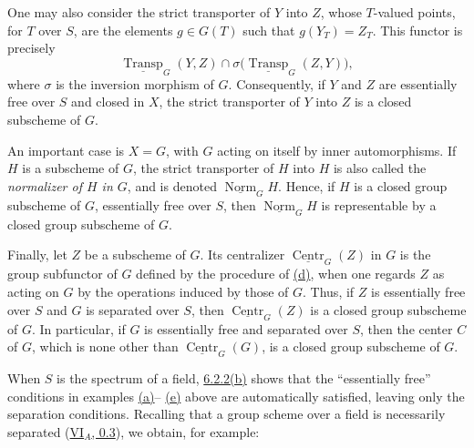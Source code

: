 One may also consider the strict transporter of \(Y\) into
\(Z\),%
whose \(T\)-valued points, for \(T\) over \(S\), are the elements
\(g\in G(T)\) such that \(g(Y_T)=Z_T\). This functor is precisely
\[
  \underline{\operatorname{Transp}}_G(Y,Z)
  \cap
  \sigma\bigl(\underline{\operatorname{Transp}}_G(Z,Y)\bigr),
\]
where \(\sigma\) is the inversion morphism of \(G\). Consequently,
if \(Y\) and \(Z\) are essentially free over \(S\) and closed in
\(X\), the strict transporter of \(Y\) into \(Z\) is a closed
subscheme of \(G\).

An important case is \(X=G\), with \(G\) acting on itself by
inner automorphisms. If \(H\) is a subscheme of \(G\), the strict
transporter of \(H\) into \(H\) is also called the
\emph{normalizer of \(H\) in \(G\)}, and is denoted
\(\underline{\operatorname{Norm}}_G H\). Hence, if \(H\) is a
closed group subscheme of \(G\), essentially free over \(S\),
then \(\underline{\operatorname{Norm}}_G H\) is representable by
a closed group subscheme of \(G\).

Finally, let \(Z\) be a subscheme of \(G\). Its centralizer
\(\underline{\operatorname{Centr}}_G(Z)\) in \(G\) is the group
subfunctor of \(G\) defined by the procedure of
\hyperref[ex:sga3-VIB-6.2.4-d]{(d)}, when one regards \(Z\) as
acting on \(G\) by the operations induced by those of \(G\).
Thus, if \(Z\) is essentially free over \(S\) and \(G\) is
separated over \(S\), then
\(\underline{\operatorname{Centr}}_G(Z)\) is a closed group
subscheme of \(G\). In particular, if \(G\) is essentially free
and separated over \(S\), then the center \(C\) of \(G\), which
is none other than \(\underline{\operatorname{Centr}}_G(G)\), is
a closed group subscheme of \(G\).

When \(S\) is the spectrum of a field,
\hyperref[prop:sga3-VIB-6.2.2]{6.2.2\textup{(b)}} shows that the
``essentially free'' conditions in examples
\hyperref[ex:sga3-VIB-6.2.4-a]{(a)}--%
\hyperref[ex:sga3-VIB-6.2.4-e]{(e)} above are automatically
satisfied, leaving only the separation conditions. Recalling
that a group scheme over a field is necessarily separated
(\hyperref[sga3:VIA:0.3]{VI\(_A\), 0.3}), we obtain, for example:

